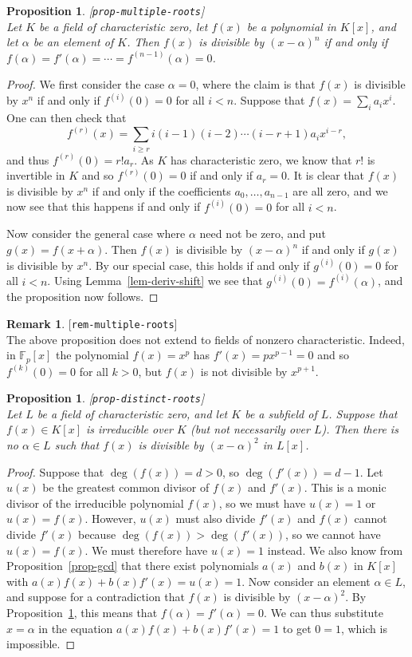 \documentclass{amsart}
\newcommand{\lbl}[1]{\label{#1}\textup{[\texttt{#1}]}\ \\}
\newcommand{\lbl}{\label}
\newcommand{\F}         {{\mathbb{F}}}
\newcommand{\al}        {\alpha}
\renewcommand{\:}{\colon}
\newtheorem{proposition}[theorem]{Proposition}
\theoremstyle{definition}
\newtheorem{remark}[theorem]{Remark}
\begin{document}
\begin{proposition}\lbl{prop-multiple-roots}
 Let $K$ be a field of characteristic zero, let $f(x)$ be a
 polynomial in $K[x]$, and let $\al$ be an element of $K$.  Then
 $f(x)$ is divisible by $(x-\al)^n$ if and only if
 $f(\al)=f'(\al)=\dotsb=f^{(n-1)}(\al)=0$. 
\end{proposition}
\begin{proof}
 We first consider the case $\al=0$, where the claim is that $f(x)$ is
 divisible by $x^n$ if and only if $f^{(i)}(0)=0$ for all $i<n$.
 Suppose that $f(x)=\sum_ia_ix^i$.  One can then check that 
 \[ f^{(r)}(x) = \sum_{i\geq r} i(i-1)(i-2)\dotsb(i-r+1)a_ix^{i-r}, \]
 and thus $f^{(r)}(0)=r!a_r$.  As $K$ has characteristic zero, we know
 that $r!$ is invertible in $K$ and so $f^{(r)}(0)=0$ if and only if
 $a_r=0$.  It is clear that $f(x)$ is divisible by $x^n$ if and only
 if the coefficients $a_0,\dotsc,a_{n-1}$ are all zero, and we now see
 that this happens if and only if $f^{(i)}(0)=0$ for all $i<n$.

 Now consider the general case where $\al$ need not be zero, and 
 put $g(x)=f(x+\al)$.  Then $f(x)$ is divisible by $(x-\al)^n$ if and
 only if $g(x)$ is divisible by $x^n$.  By our special case, this
 holds if and only if  $g^{(i)}(0)=0$ for all $i<n$.  Using
 Lemma~\ref{lem-deriv-shift} we see that $g^{(i)}(0)=f^{(i)}(\al)$,
 and the proposition now follows.
\end{proof}

\begin{remark}\lbl{rem-multiple-roots}
 The above proposition does not extend to fields of nonzero
 characteristic.  Indeed, in $\F_p[x]$ the polynomial $f(x)=x^p$ has
 $f'(x)=px^{p-1}=0$ and so $f^{(k)}(0)=0$ for all $k>0$, but $f(x)$ is
 not divisible by $x^{p+1}$.
\end{remark}

\begin{proposition}\lbl{prop-distinct-roots}
 Let $L$ be a field of characteristic zero, and let $K$ be a subfield
 of $L$.  Suppose that $f(x)\in K[x]$ is irreducible over $K$ (but not
 necessarily over $L$).  Then there is no $\al\in L$ such that $f(x)$
 is divisible by $(x-\al)^2$ in $L[x]$.
\end{proposition}
\begin{proof}
 Suppose that $\deg(f(x))=d>0$, so $\deg(f'(x))=d-1$.  Let $u(x)$ be
 the greatest common divisor of $f(x)$ and $f'(x)$.  This is a monic
 divisor of the irreducible polynomial $f(x)$, so we must have
 $u(x)=1$ or $u(x)=f(x)$.  However, $u(x)$ must also divide $f'(x)$
 and $f(x)$ cannot divide $f'(x)$ because $\deg(f(x))>\deg(f'(x))$, so
 we cannot have $u(x)=f(x)$.  We must therefore have $u(x)=1$
 instead.  We also know from Proposition~\ref{prop-gcd} that there
 exist polynomials $a(x)$ and $b(x)$ in $K[x]$ with
 $a(x)f(x)+b(x)f'(x)=u(x)=1$.  Now consider an element $\al\in L$, and
 suppose for a contradiction that $f(x)$ is divisible by $(x-\al)^2$.
 By Proposition~\ref{prop-multiple-roots}, this means that
 $f(\al)=f'(\al)=0$.  We can thus substitute $x=\al$ in the equation
 $a(x)f(x)+b(x)f'(x)=1$ to get $0=1$, which is impossible.
\end{proof}
\end{document}
